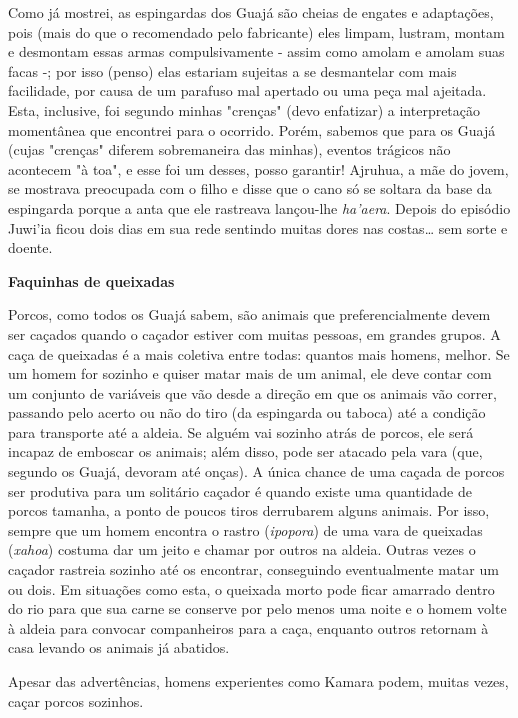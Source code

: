 Como já mostrei, as espingardas dos Guajá são cheias de engates e
adaptações, pois (mais do que o recomendado pelo fabricante) eles
limpam, lustram, montam e desmontam essas armas compulsivamente - assim
como amolam e amolam suas facas -; por isso (penso) elas estariam
sujeitas a se desmantelar com mais facilidade, por causa de um parafuso
mal apertado ou uma peça mal ajeitada. Esta, inclusive, foi segundo
minhas "crenças" (devo enfatizar) a interpretação momentânea que
encontrei para o ocorrido. Porém, sabemos que para os Guajá (cujas
"crenças" diferem sobremaneira das minhas), eventos trágicos não
acontecem "à toa", e esse foi um desses, posso garantir! Ajruhua, a mãe
do jovem, se mostrava preocupada com o filho e disse que o cano só se
soltara da base da espingarda porque a anta que ele rastreava lançou-lhe
\emph{ha'aera}. Depois do episódio Juwi'ia ficou dois dias em sua rede
sentindo muitas dores nas costas\ldots{} sem sorte e doente.

\textbf{Faquinhas de queixadas}

Porcos, como todos os Guajá sabem, são animais que preferencialmente
devem ser caçados quando o caçador estiver com muitas pessoas, em
grandes grupos. A caça de queixadas é a mais coletiva entre todas:
quantos mais homens, melhor. Se um homem for sozinho e quiser matar mais
de um animal, ele deve contar com um conjunto de variáveis que vão desde
a direção em que os animais vão correr, passando pelo acerto ou não do
tiro (da espingarda ou taboca) até a condição para transporte até a
aldeia. Se alguém vai sozinho atrás de porcos, ele será incapaz de
emboscar os animais; além disso, pode ser atacado pela vara (que,
segundo os Guajá, devoram até onças). A única chance de uma caçada de
porcos ser produtiva para um solitário caçador é quando existe uma
quantidade de porcos tamanha, a ponto de poucos tiros derrubarem alguns
animais. Por isso, sempre que um homem encontra o rastro
(\emph{ipopora}) de uma vara de queixadas (\emph{xahoa}) costuma dar um
jeito e chamar por outros na aldeia. Outras vezes o caçador rastreia
sozinho até os encontrar, conseguindo eventualmente matar um ou dois. Em
situações como esta, o queixada morto pode ficar amarrado dentro do rio
para que sua carne se conserve por pelo menos uma noite e o homem volte
à aldeia para convocar companheiros para a caça, enquanto outros
retornam à casa levando os animais já abatidos.

Apesar das advertências, homens experientes como Kamara podem, muitas
vezes, caçar porcos sozinhos.

